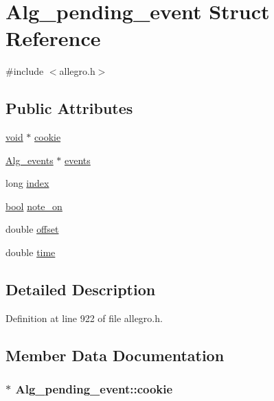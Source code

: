 \hypertarget{struct_alg__pending__event}{}\section{Alg\+\_\+pending\+\_\+event Struct Reference}
\label{struct_alg__pending__event}


{\ttfamily \#include $<$allegro.\+h$>$}

\subsection*{Public Attributes}
\begin{DoxyCompactItemize}
\item 
\hyperlink{sound_8c_ae35f5844602719cf66324f4de2a658b3}{void} $\ast$ \hyperlink{struct_alg__pending__event_a04d9f6fd0e0bf8f777b246b2f5c49725}{cookie}
\item 
\hyperlink{class_alg__events}{Alg\+\_\+events} $\ast$ \hyperlink{struct_alg__pending__event_af6d5ffc2eca945988f37a3cdf07eb694}{events}
\item 
long \hyperlink{struct_alg__pending__event_a77e92c8e31db9053f9f88c56a882ca77}{index}
\item 
\hyperlink{mac_2config_2i386_2lib-src_2libsoxr_2soxr-config_8h_abb452686968e48b67397da5f97445f5b}{bool} \hyperlink{struct_alg__pending__event_a157ecddba184bfb9232bfa57dd456079}{note\+\_\+on}
\item 
double \hyperlink{struct_alg__pending__event_ab60d942720d83309e9a55b29f516c2b7}{offset}
\item 
double \hyperlink{struct_alg__pending__event_a7508ce31a50f82f4b6bf08b6bdd07b3f}{time}
\end{DoxyCompactItemize}


\subsection{Detailed Description}


Definition at line 922 of file allegro.\+h.



\subsection{Member Data Documentation}
\subsubsection[{\texorpdfstring{cookie}{cookie}}]{$\ast$ Alg\+\_\+pending\+\_\+event\+::cookie}\hypertarget{struct_alg__pending__event_a04d9f6fd0e0bf8f777b246b2f5c49725}{}\label{struct_alg__pending__event_a04d9f6fd0e0bf8f777b246b2f5c49725}


